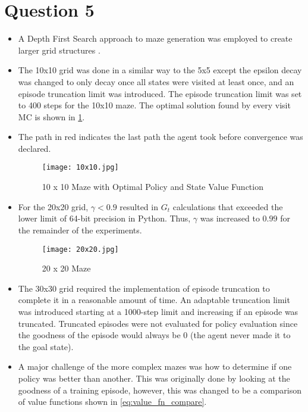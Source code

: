 \documentclass[letterpaper]{article} %
\begin{document}
\section{Question 5}
	\begin{itemize}
	    \item A Depth First Search approach to maze generation was employed to create larger grid structures \cite{CopeMazeGenerationDFS}.
	    \item The 10x10 grid was done in a similar way to the 5x5 except the epsilon decay was changed to only decay once all states were visited at least once, and an episode truncation limit was introduced. The episode truncation limit was set to 400 steps for the 10x10 maze. The optimal solution found by every visit MC is shown in \ref{fig:10x10_solution}.
	    \item The path in red indicates the last path the agent took before convergence was declared.

	    \begin{figure}[htbp]
	      \centering
	      \texttt{[image: 10x10.jpg]}
		\caption{10 x 10 Maze with Optimal Policy and State Value Function}
	      \label{fig:10x10_solution}
	    \end{figure}

	    \item For the 20x20 grid, $\gamma < 0.9$ resulted in $G_t$ calculations that exceeded the lower limit of 64-bit precision in Python. Thus, $\gamma$ was increased to $0.99$ for the remainder of the experiments.

	    \begin{figure}[htbp]
	      \centering
	      \texttt{[image: 20x20.jpg]}
		\caption{20 x 20 Maze}
	      \label{fig:20x20_solution}
	    \end{figure}

	    \item The 30x30 grid required the implementation of episode truncation to complete it in a reasonable amount of time. An adaptable truncation limit was introduced starting at a 1000-step limit and increasing if an episode was truncated. Truncated episodes were not evaluated for policy evaluation since the goodness of the episode would always be 0 (the agent never made it to the goal state).
	    \item A major challenge of the more complex mazes was how to determine if one policy was better than another. This was originally done by looking at the goodness of a training episode, however, this was changed to be a comparison of value functions shown in \ref{eq:value_fn_compare}.


\end{itemize}
\end{document}
